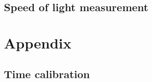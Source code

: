 \documentclass[]{article}
\begin{document}


\subsection{Speed of light measurement}\label{c determination}


\section{Appendix}\label{appendix}
\subsection{Time calibration}
\end{document}
